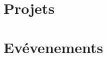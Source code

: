 \begin{sloppypar}
\begin{paracol}{2}



\switchcolumn





\section{Projets}




\section{Ev\'evenements}




\end{paracol}
\end{sloppypar}

